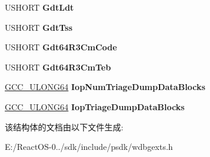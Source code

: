 \begin{DoxyCompactItemize}
U\+S\+H\+O\+RT {\bfseries Gdt\+Ldt}
\item 
\mbox{\label{struct___k_d_d_e_b_u_g_g_e_r___d_a_t_a64_a97598be13910636555e344078c8906fb}} 
U\+S\+H\+O\+RT {\bfseries Gdt\+Tss}
\item 
\mbox{\label{struct___k_d_d_e_b_u_g_g_e_r___d_a_t_a64_ab14d8deecba7436018e3b338d50a58d4}} 
U\+S\+H\+O\+RT {\bfseries Gdt64\+R3\+Cm\+Code}
\item 
\mbox{\label{struct___k_d_d_e_b_u_g_g_e_r___d_a_t_a64_a1f2d038273f5fadcacd137aa75918ae8}} 
U\+S\+H\+O\+RT {\bfseries Gdt64\+R3\+Cm\+Teb}
\item 
\mbox{\label{struct___k_d_d_e_b_u_g_g_e_r___d_a_t_a64_ae540e5b804ef8d24dfbee2dcfecf703f}} 
\hyperlink{union___g_c_c___u_l_o_n_g64}{G\+C\+C\+\_\+\+U\+L\+O\+N\+G64} {\bfseries Iop\+Num\+Triage\+Dump\+Data\+Blocks}
\item 
\mbox{\label{struct___k_d_d_e_b_u_g_g_e_r___d_a_t_a64_ad7cf05472725c504c6e06b9a3fa0843c}} 
\hyperlink{union___g_c_c___u_l_o_n_g64}{G\+C\+C\+\_\+\+U\+L\+O\+N\+G64} {\bfseries Iop\+Triage\+Dump\+Data\+Blocks}
\end{DoxyCompactItemize}


该结构体的文档由以下文件生成\+:\begin{DoxyCompactItemize}
\item 
E\+:/\+React\+O\+S-\/0../sdk/include/psdk/wdbgexts.\+h\end{DoxyCompactItemize}
